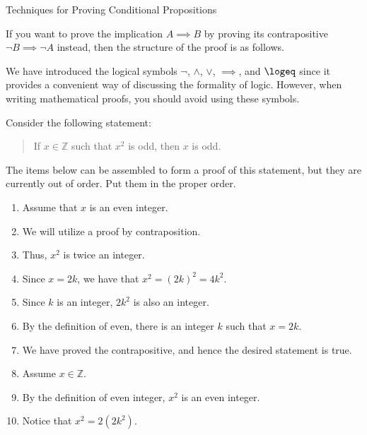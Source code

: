 \begin{section}{Techniques for Proving Conditional Propositions}
\begin{skeleton}\label{pf by contraposition}
If you want to prove the implication $A\implies B$ by proving its contrapositive $\neg B\implies \neg A$ instead, then the structure of the proof is as follows.

\begin{center}
\end{center}
\end{skeleton}

We have introduced the logical symbols $\neg$, $\wedge$, $\vee$, $\implies$, and $\logeq$  since it provides a convenient way of discussing the formality of logic.  However, when writing mathematical proofs, you should avoid using these symbols.

\begin{problem}
Consider the following statement:
\begin{quote}
If $x\in\mathbb{Z}$ such that $x^2$ is odd, then $x$ is odd.
\end{quote}
The items below can be assembled to form a proof of this statement, but they are currently out of order.  Put them in the proper order.
\begin{enumerate}
\item Assume that $x$ is an even integer.
\item We will utilize a proof by contraposition.
\item Thus, $x^2$ is twice an integer.
\item Since $x=2k$, we have that $x^2 =(2k)^2 =4k^2$.
\item Since $k$ is an integer, $2k^2$ is also an integer.
\item By the definition of even, there is an integer $k$ such that $x=2k$.
\item We have proved the contrapositive, and hence the desired statement is true.
\item Assume $x\in \mathbb{Z}$.
\item By the definition of even integer, $x^2$ is an even integer.
\item Notice that $x^2 = 2(2k^2)$.
\end{enumerate}
\end{problem}


\end{section}
